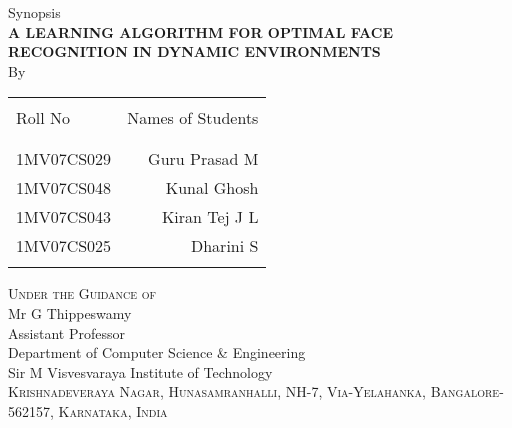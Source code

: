 \begin{titlepage}

\begin{center}

\textup{\large Synopsis}\\[1.0cm]

\uppercase{\Large \textbf {A Learning Algorithm for Optimal Face Recognition in Dynamic Environments}}\\[3.0cm]

\normalsize By \\
\begin{table}[h]
\centering
\begin{tabular}{lr}\hline \\
Roll No & Names of Students \\ \\ \hline
\\
1MV07CS029 & Guru Prasad M \\
1MV07CS048 & Kunal Ghosh \\
1MV07CS043 & Kiran Tej J L \\
1MV07CS025 & Dharini S \\ \\ \hline 
\end{tabular}
\end{table}

\vfill

\normalsize
\textsc{Under the Guidance of }\\
Mr G Thippeswamy\\
{\small Assistant Professor}\\
{\small Department of Computer Science & Engineering}\\
\LARGE{Sir M Visvesvaraya Institute of Technology }\\
\normalsize
\textsc{Krishnadeveraya Nagar, Hunasamranhalli, NH-7,
Via-Yelahanka, Bangalore-562157, Karnataka, India}\\

\vspace{0.5cm}


\end{center}

\end{titlepage}

